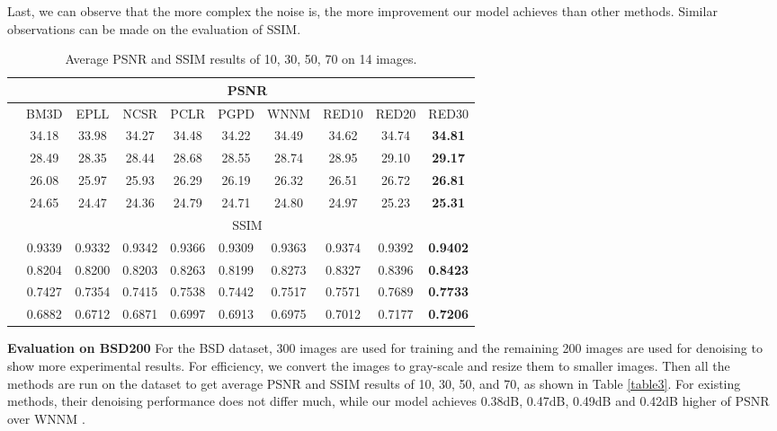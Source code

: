 \documentclass[10pt,journal,compsoc]{IEEEtran}
\begin{document}
Last, we can observe that the
more complex the noise is, the more improvement our model achieves than other methods.
Similar observations can be made on the evaluation of SSIM.

\begin{table*}[htb!]
\centering
\caption{Average PSNR and SSIM results of  10, 30, 50, 70 on 14 images.}
\begin{tabular}{c|c c c c c c c c c} \hline
              &\multicolumn{9}{c}{PSNR}            \\ \hline
              &BM3D   &EPLL   &NCSR   &PCLR   &PGPD   &WNNM   &RED10  &RED20  &RED30          \\ \hline
   &34.18  &33.98  &34.27  &34.48  &34.22  &34.49  &34.62  &34.74  &\textbf{34.81} \\ \hline
   &28.49  &28.35  &28.44  &28.68  &28.55  &28.74  &28.95  &29.10  &\textbf{29.17} \\ \hline
   &26.08  &25.97  &25.93  &26.29  &26.19  &26.32  &26.51  &26.72  &\textbf{26.81} \\ \hline
   &24.65  &24.47  &24.36  &24.79  &24.71  &24.80  &24.97  &25.23  &\textbf{25.31} \\ \hline
              &\multicolumn{9}{c}{SSIM}            \\ \hline
   &0.9339 &0.9332 &0.9342 &0.9366 &0.9309 &0.9363 &0.9374 &0.9392 &\textbf{0.9402} \\ \hline
   &0.8204 &0.8200 &0.8203 &0.8263 &0.8199 &0.8273 &0.8327 &0.8396 &\textbf{0.8423} \\ \hline
   &0.7427 &0.7354 &0.7415 &0.7538 &0.7442 &0.7517 &0.7571 &0.7689 &\textbf{0.7733} \\ \hline
   &0.6882 &0.6712 &0.6871 &0.6997 &0.6913 &0.6975 &0.7012 &0.7177 &\textbf{0.7206} \\ \hline
\end{tabular}
\label{table2}
\end{table*}



{\bf{Evaluation on BSD200}} For the BSD dataset, 300 images are used for training and
the remaining 200 images are used for denoising to show more experimental results.
For efficiency, we convert the images to gray-scale and resize them to smaller images.
Then all the methods are run on the dataset to get average PSNR and SSIM results of
 10, 30, 50, and 70, as shown in Table \ref{table3}. For existing methods,
their denoising performance does not differ much, while our model achieves 0.38dB,
0.47dB, 0.49dB and 0.42dB higher of PSNR over WNNM \cite{DBLP:conf/cvpr/GuZZF14}.
\end{document}
